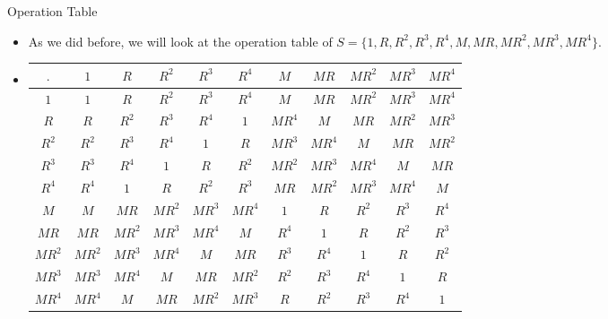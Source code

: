 \documentclass[ %
 10pt, xcolor={dvipsnames,svgnames,x11names,hyperref},
   hyperref={colorlinks=true,citecolor=green,linkcolor=DarkRed,urlcolor=ProcessBlue,anchorcolor=blue}
  ]{beamer}
\newenvironment{stepitemize}{\begin{itemize}[<+->]}{\end{itemize} }
\begin{document}
\begin{frame}{Operation Table}
\begin{stepitemize}
\item As we did before, we will look at the operation table of $S = \{1, R, R^2, R^3, R^4, M, MR, MR^2, MR^3, MR^4\}$.

\bigskip

\item[]
\scriptsize{
\begin{center}
\begin{table}[H]
\begin{tabular}{ c| c | c |c|c|c|c|c|c|c|c}
$.$  & $1$ & $R$ & $R^2$ & $R^3$ & $R^4$ & $M$ & $MR$ & $MR^2$ & $MR^3$ & $MR^4$ \\
\hline
$1$ & $1$ & $R$ & $R^2$ & $R^3$ & $R^4$ & $M$ & $MR$ & $MR^2$ & $MR^3$ & $MR^4$ \\ 
\hline
$R$ & $R$ & $R^2$ & $R^3$ & $R^4$ & $1$ & $MR^4$ & $M$ & $MR$ & $MR^2$ & $MR^3$\\ 
\hline
$R^2$ & $R^2$ & $R^3$ & $R^4$ & $1$ & $R$ & $MR^3$ & $MR^4$ & $M$ & $MR$ & $MR^2$\\ 
\hline
$R^3$ & $R^3$ & $R^4$ & $1$ & $R$ & $R^2$ & $MR^2$ & $MR^3$ & $MR^4$ & $M$ & $MR$\\ 
\hline
$R^4$ & $R^4$ & $1$ & $R$ & $R^2$ & $R^3$ & $MR$ & $MR^2$ & $MR^3$ & $MR^4$ & $M$\\ 
\hline
$M$ & $M$ & $MR$ & $MR^2$ & $MR^3$ & $MR^4$ & $1$ & $R$ & $R^2$ & $R^3$ & $R^4$\\ 
\hline
$MR$ & $MR$ & $MR^2$ & $MR^3$ & $MR^4$ & $M$ & $R^4$ & $1$ & $R$ & $R^2$ & $R^3$\\ 
\hline
$MR^2$ & $MR^2$ & $MR^3$ & $MR^4$ & $M$ & $MR$ & $R^3$ & $R^4$ & $1$ & $R$ & $R^2$\\ 
\hline
$MR^3$ & $MR^3$ & $MR^4$ & $M$ & $MR$ & $MR^2$ & $R^2$ & $R^3$ & $R^4$ & $1$ & $R$\\
\hline
$MR^4$ & $MR^4$ & $M$ & $MR$ & $MR^2$ & $MR^3$ & $R$ & $R^2$ & $R^3$ & $R^4$ & $1$\\ 

\end{tabular}
\end{table}

\end{center}
}

\end{stepitemize}
    
\end{frame}
\end{document}
